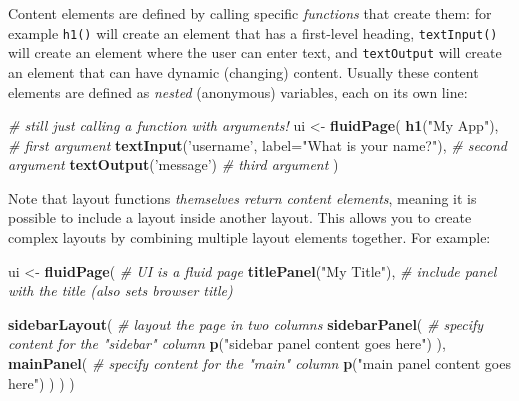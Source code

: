 \documentclass[]{book}
\newenvironment{Shaded}{\begin{snugshade}}{\end{snugshade}}
\newcommand{\KeywordTok}[1]{\textcolor[rgb]{0.13,0.29,0.53}{\textbf{#1}}}
\newcommand{\DataTypeTok}[1]{\textcolor[rgb]{0.13,0.29,0.53}{#1}}
\newcommand{\StringTok}[1]{\textcolor[rgb]{0.31,0.60,0.02}{#1}}
\newcommand{\CommentTok}[1]{\textcolor[rgb]{0.56,0.35,0.01}{\textit{#1}}}
\newcommand{\NormalTok}[1]{#1}
\theoremstyle{definition}
\theoremstyle{definition}
\theoremstyle{remark}
\begin{document}
Content elements are defined by calling specific \emph{functions} that
create them: for example \texttt{h1()} will create an element that has a
first-level heading, \texttt{textInput()} will create an element where
the user can enter text, and \texttt{textOutput} will create an element
that can have dynamic (changing) content. Usually these content elements
are defined as \emph{nested} (anonymous) variables, each on its own
line:

\begin{Shaded}
\begin{Highlighting}[]
\CommentTok{# still just calling a function with arguments!}
\NormalTok{ui <-}\StringTok{ }\KeywordTok{fluidPage}\NormalTok{(}
  \KeywordTok{h1}\NormalTok{(}\StringTok{"My App"}\NormalTok{),  }\CommentTok{# first argument}
  \KeywordTok{textInput}\NormalTok{(}\StringTok{'username'}\NormalTok{, }\DataTypeTok{label=}\StringTok{"What is your name?"}\NormalTok{),  }\CommentTok{# second argument}
  \KeywordTok{textOutput}\NormalTok{(}\StringTok{'message'}\NormalTok{)  }\CommentTok{# third argument}
\NormalTok{)}
\end{Highlighting}
\end{Shaded}

Note that layout functions \emph{themselves return content elements},
meaning it is possible to include a layout inside another layout. This
allows you to create complex layouts by combining multiple layout
elements together. For example:

\begin{Shaded}
\begin{Highlighting}[]
\NormalTok{ui <-}\StringTok{ }\KeywordTok{fluidPage}\NormalTok{(   }\CommentTok{# UI is a fluid page}
  \KeywordTok{titlePanel}\NormalTok{(}\StringTok{"My Title"}\NormalTok{),  }\CommentTok{# include panel with the title (also sets browser title)}

  \KeywordTok{sidebarLayout}\NormalTok{(   }\CommentTok{# layout the page in two columns}
    \KeywordTok{sidebarPanel}\NormalTok{(  }\CommentTok{# specify content for the "sidebar" column}
      \KeywordTok{p}\NormalTok{(}\StringTok{"sidebar panel content goes here"}\NormalTok{)}
\NormalTok{    ),}
    \KeywordTok{mainPanel}\NormalTok{(     }\CommentTok{# specify content for the "main" column}
      \KeywordTok{p}\NormalTok{(}\StringTok{"main panel content goes here"}\NormalTok{)}
\NormalTok{    )}
\NormalTok{  )}
\NormalTok{)}
\end{Highlighting}
\end{Shaded}
\end{document}
